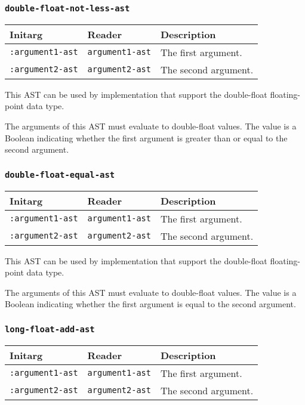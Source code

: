 \subsubsection{\texttt{double-float-not-less-ast}}
\label{sec-ast-double-float-not-less}

\begin{tabular}{|l|l|l|}
\hline
Initarg & Reader & Description\\
\hline\hline
\texttt{:argument1-ast} & \texttt{argument1-ast} & The first argument.\\
\hline
\texttt{:argument2-ast} & \texttt{argument2-ast} & The second argument.\\
\hline
\end{tabular}

This AST can be used by implementation that support the double-float
floating-point data type.  

The arguments of this AST must evaluate to double-float
values.  The value is a Boolean indicating whether the first argument
is greater than or equal to the second argument.

\subsubsection{\texttt{double-float-equal-ast}}
\label{sec-ast-double-float-equal}

\begin{tabular}{|l|l|l|}
\hline
Initarg & Reader & Description\\
\hline\hline
\texttt{:argument1-ast} & \texttt{argument1-ast} & The first argument.\\
\hline
\texttt{:argument2-ast} & \texttt{argument2-ast} & The second argument.\\
\hline
\end{tabular}

This AST can be used by implementation that support the double-float
floating-point data type.  

The arguments of this AST must evaluate to double-float
values.  The value is a Boolean indicating whether the first argument
is equal to the second argument.

\subsubsection{\texttt{long-float-add-ast}}
\label{sec-ast-long-float-add}

\begin{tabular}{|l|l|l|}
\hline
Initarg & Reader & Description\\
\hline\hline
\texttt{:argument1-ast} & \texttt{argument1-ast} & The first argument.\\
\hline
\texttt{:argument2-ast} & \texttt{argument2-ast} & The second argument.\\
\hline
\end{tabular}

